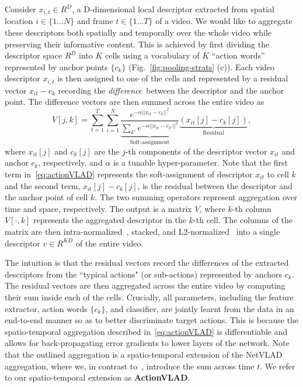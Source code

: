 \documentclass[10pt,twocolumn,letterpaper]{article}
\newcommand{\methodTag}[0]{ActionVLAD}
\begin{document}
Consider $x_{i,t} \in R^D$, a D-dimensional local descriptor extracted from spatial location $i \in \{1 \ldots N\}$ and frame $t \in \{1 \ldots T\}$ of a video. We would like to aggregate these descriptors both spatially and temporally over the whole video while preserving their informative content.
This is achieved by first dividing the descriptor space $R^D$ into $K$ cells using a vocabulary of $K$ ``action words'' represented by anchor points $\{c_k\}$ (Fig.~\ref{fig:pooling-strats} (c)).
Each video descriptor $x_{i,t}$ is then assigned to one of the cells and represented by a residual vector  $x_{it} - c_k$ recording the {\em difference}\ between the descriptor and the anchor point.
The difference vectors are then summed across the entire video as
\begin{equation}
\label{eq:actionVLAD}
        V[j,k] = \sum_{t=1}^{T} \sum_{i=1}^{N}
         \underbrace{\frac{e^{-\alpha||{x_{it}-c_k}||^2}}{\sum_{k'}{e^{-\alpha||{x_{it}- c_{k'}||^2}}}} }_\text{Soft-assignment} 
      \underbrace{\left(
            x_{it}[j] - c_k[j]
        \right)
        }_\text{Residual}
        ,
\end{equation}
where $x_{it}[j]$ and $c_k[j]$ are the $j$-th components of the descriptor vector $x_{it}$ and anchor $c_k$, respectively, and $\alpha$ is a tunable hyper-parameter. Note that the first term in~\eqref{eq:actionVLAD} represents the soft-assignment of descriptor $x_{it}$ to cell $k$ and the second term, $x_{it}[j] - c_k[j]$, is the residual between the descriptor and the anchor point of cell $k$. The two summing operators represent aggregation over time and space, respectively. The output is a matrix $V$, where $k$-th column $V[\cdot,k]$ represents the aggregated descriptor in the $k$-th cell. The columns of the matrix are then intra-normalized~\cite{Arandjelovic13}, stacked, and L2-normalized~\cite{Jegou_10_VLAD} into a single descriptor $v \in R^{KD}$ of the entire video.

The intuition is that the residual vectors record the differences of the extracted descriptors from the ``typical actions" (or sub-actions) represented by anchors $c_k$. The residual vectors are then aggregated across the entire video by computing their sum inside each of the cells. Crucially, all parameters, including the feature extractor, action words $\{c_k\}$, and classifier, are jointly learnt from the data in an end-to-end manner so as to better discriminate target actions. This is because the spatio-temporal aggregation described in~\eqref{eq:actionVLAD} is differentiable and allows for back-propagating error gradients to lower layers of the network. 
Note that the outlined aggregation is a spatio-temporal extension of the NetVLAD~\cite{Arandjelovic16} aggregation, where we, in contrast to~\cite{Arandjelovic16}, introduce the sum across time $t$. We refer to our spatio-temporal extension as {\bf \methodTag{}}.
\end{document}
